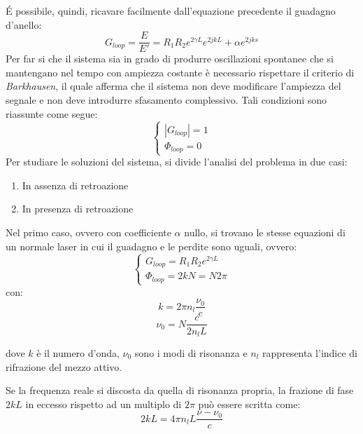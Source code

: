 \'E possibile, quindi, ricavare facilmente dall'equazione precedente il guadagno d'anello:
\begin{equation}
	G_{loop}=\frac{E}{E'}=R_1R_2e^{2\gamma L}e^{2jkL}+\alpha e^{2jks}
	\label{gloop}
\end{equation}
Per far si che il sistema sia in grado di produrre oscillazioni spontanee che si mantengano nel tempo con ampiezza costante è necessario rispettare il criterio di \textit{Barkhausen}, il quale afferma che il sistema non deve modificare l'ampiezza del segnale e non deve introdurre sfasamento complessivo. Tali condizioni sono riassunte come segue:
\begin{equation}
	\begin{cases}
   |G_{loop}|=1\\\Phi_{loop} = 0
   \end{cases}
\end{equation}
Per studiare le soluzioni del sistema, si divide l'analisi del problema in due casi:
\begin{enumerate}
	\item In assenza di retroazione 
	\item In presenza di retroazione
\end{enumerate}
Nel primo caso, ovvero con coefficiente $\alpha$ nullo, si trovano le stesse equazioni di un normale laser in cui il guadagno e le perdite sono uguali, ovvero:
\begin{equation}
	\begin{cases}
   G_{loop}=R_1R_2e^{2\gamma L}\\\Phi_{loop} = 2kN=N2\pi
   \end{cases}
   \label{sistnoretr}
\end{equation}
con:
\begin{equation}
k=2\pi n_l \frac{\nu_0}{c}	
\end{equation}
\begin{equation}
	\nu_0 = N\frac{c}{2n_lL}
\end{equation}

dove $k$ è il numero d'onda, $\nu_0$ sono i modi di risonanza e $n_l$ rappresenta l'indice di rifrazione del mezzo attivo.

Se la frequenza reale si discosta da quella di risonanza propria, la frazione di fase $2kL$ in eccesso rispetto ad un multiplo di $2\pi$ può essere scritta come:
\begin{equation}
	2kL=4\pi n_l L \frac{\nu - \nu_0}{c}
\end{equation}

